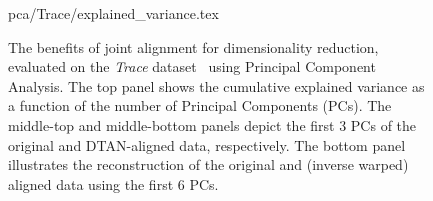 \begin{figure}[t]
    {pca/Trace/explained_variance.tex}
    \centering
    \def\figwidth{0.92\linewidth} %

    
    \caption{The benefits of joint alignment for dimensionality reduction, evaluated on the \textit{Trace} dataset~\cite{Dau:2019:ucr} using Principal Component Analysis. The top panel shows the cumulative explained variance as a function of the number of Principal Components (PCs). The middle-top and middle-bottom panels depict the first 3 PCs of the original and DTAN-aligned data, respectively. The bottom panel illustrates the reconstruction of the original and (inverse warped) aligned data using the first 6 PCs.}
    
    \label{fig:pca}
    \end{figure}


